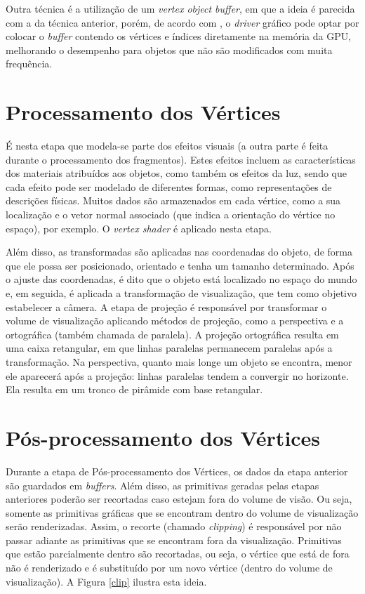 \begin{anexosenv}
	Outra técnica é a utilização de um  \textit{vertex object buffer}, em que a ideia é parecida com a da técnica anterior, porém, de acordo com \cite{vbo}, o \textit{driver} gráfico pode optar por colocar o \textit{buffer} contendo os vértices e índices diretamente na memória da GPU, melhorando o desempenho para objetos que não são modificados com muita frequência. 

\section{Processamento dos Vértices}

	É nesta etapa que modela-se parte dos efeitos visuais (a outra parte é feita durante o processamento dos fragmentos).  Estes efeitos incluem as características dos materiais atribuídos aos objetos, como também os efeitos da luz, sendo que cada efeito pode ser modelado de diferentes formas, como representações de descrições físicas. Muitos dados são armazenados em cada vértice, como a sua localização e o vetor normal associado (que indica a orientação do vértice no espaço), por exemplo. O \textit{vertex shader} é aplicado nesta etapa.

	Além disso, as transformadas são aplicadas nas coordenadas do objeto, de forma que ele possa ser posicionado, orientado e tenha um tamanho determinado. Após o ajuste das coordenadas, é dito que o objeto está localizado no espaço do mundo e, em seguida, é aplicada a transformação de visualização, que tem como objetivo estabelecer a câmera. A etapa de projeção é responsável por transformar o volume de visualização aplicando métodos de projeção, como a perspectiva e a ortográfica (também chamada de paralela). A projeção ortográfica resulta em uma caixa retangular, em que linhas paralelas permanecem paralelas após a transformação. Na perspectiva, quanto mais longe um objeto se encontra, menor ele aparecerá após a projeção: linhas paralelas tendem a convergir no horizonte. Ela resulta em um tronco de pirâmide com base retangular. 
	
\section{Pós-processamento dos Vértices}

	Durante a etapa de Pós-processamento dos Vértices, os dados da etapa anterior são guardados em \textit{buffers}. Além disso, as primitivas geradas pelas etapas anteriores poderão ser recortadas caso estejam fora do volume de visão. Ou seja, somente as primitivas gráficas que se encontram dentro do volume de visualização serão renderizadas. Assim, o recorte (chamado \textit{clipping}) é responsável por não passar adiante as primitivas que se encontram fora da visualização. Primitivas que estão parcialmente dentro são recortadas, ou seja, o vértice que está de fora não é renderizado e é substituído por um novo vértice (dentro do volume de visualização). A  Figura \ref{clip} ilustra esta ideia.


\end{anexosenv}
